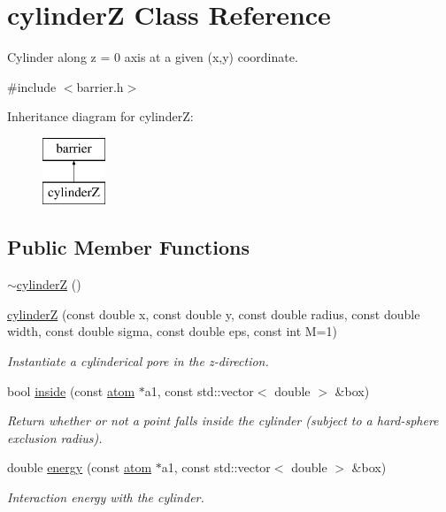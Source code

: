 \hypertarget{classcylinder_z}{\section{cylinder\-Z Class Reference}
\label{classcylinder_z}
}


Cylinder along z = 0 axis at a given (x,y) coordinate.  




{\ttfamily \#include $<$barrier.\-h$>$}

Inheritance diagram for cylinder\-Z\-:\begin{figure}[H]
\begin{center}
\leavevmode
\includegraphics[height=2.000000cm]{classcylinder_z}
\end{center}
\end{figure}
\subsection*{Public Member Functions}
\begin{DoxyCompactItemize}
\item 
\hyperlink{classcylinder_z_a06f3ecc97023c1806d587f93a1c6c565}{$\sim$cylinder\-Z} ()
\item 
\hyperlink{classcylinder_z_a6891adbe87a6814239c8a143e996b1b0}{cylinder\-Z} (const double x, const double y, const double radius, const double width, const double sigma, const double eps, const int M=1)
\begin{DoxyCompactList}\small\item\em Instantiate a cylinderical pore in the z-\/direction. \end{DoxyCompactList}\item 
bool \hyperlink{classcylinder_z_aff84684096c1d04d73ee894b499a0a2f}{inside} (const \hyperlink{classatom}{atom} $\ast$a1, const std\-::vector$<$ double $>$ \&box)
\begin{DoxyCompactList}\small\item\em Return whether or not a point falls inside the cylinder (subject to a hard-\/sphere exclusion radius). \end{DoxyCompactList}\item 
double \hyperlink{classcylinder_z_a0d1ec094ac9bf23b74e6f03f09477217}{energy} (const \hyperlink{classatom}{atom} $\ast$a1, const std\-::vector$<$ double $>$ \&box)
\begin{DoxyCompactList}\small\item\em Interaction energy with the cylinder. \end{DoxyCompactList}\end{DoxyCompactItemize}
